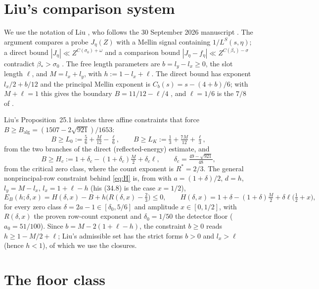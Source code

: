 \documentclass[11pt]{article}
\begin{document}
\section{Liu's comparison system}

We use the notation of Liu \cite{Liu26}, who follows the 30 September 2026 manuscript \cite{Ope26}. The argument compares a probe $J_\eta(Z)$ with a Mellin signal containing $1/L^S(s,\eta)$; a direct bound $|J_\eta|\ll Z^{C(\sigma_0)+\omega}$ and a comparison bound $|J_\eta-f_\eta|\ll Z^{C(\beta_*)-\sigma}$ contradict $\beta_*>\sigma_0$ \cite[Prop.~2.1]{Ope26}. The free length parameters are $b=l_y-l_x\ge0$, the slot length $\ell$, and $M=l_x+l_y$, with $h:=1-l_x+\ell$. The direct bound has exponent $l_x/2+b/12$ and the principal Mellin exponent is $C_b(s)=s-(4+b)/6$; with $M+\ell=1$ this gives the boundary $B=11/12-\ell/4$ \cite[(30.2)]{Liu26}, and $\ell=1/6$ is the $7/8$ of \cite{Ope26}.

Liu's Proposition~25.1 isolates three affine constraints that force $B\ge B_{\mathrm{alg}}=(1507-2\sqrt{921})/1653$:
\begin{equation}\label{eq:L}
B\ge L_0:=\tfrac56+\tfrac M{12}-\tfrac\ell6,\qquad B\ge L_K:=\tfrac13+\tfrac{7M}{12}+\tfrac\ell3,
\end{equation}
from the two branches of the direct (reflected-energy) estimate, and
\begin{equation}\label{eq:H}
B\ge H_c:=1+\delta_c-(1+\delta_c)\tfrac M2+\delta_c\ell,\qquad \delta_c=\tfrac{49-\sqrt{921}}{48},
\end{equation}
from the critical zero class, where the count exponent is $R^*=2/3$. The general nonprincipal-row constraint behind \eqref{eq:H} is, from \cite[(18.4)]{Liu26} with $a=(1+\delta)/2$, $d=h$, $l_y=M-l_x$, $l_x=1+\ell-h$ (his (34.8) is the case $x=1/2$),
\begin{equation}\label{eq:E}
E_B(h;\delta,x)=H(\delta,x)-B+h\bigl(R(\delta,x)-\tfrac23\bigr)\le0,\qquad H(\delta,x)=1+\delta-(1+\delta)\tfrac M2+\delta\ell\bigl(\tfrac12+x\bigr),
\end{equation}
for every zero class $\delta=2a-1\in[\delta_0,5/6]$ and amplitude $x\in[0,1/2]$, with $R(\delta,x)$ the proven row-count exponent and $\delta_0=1/50$ the detector floor ($a_0=51/100$). Since $b=M-2(1+\ell-h)$, the constraint $b\ge0$ reads $h\ge1-M/2+\ell$; Liu's admissible set has the strict forms $b>0$ and $l_x>\ell$ (hence $h<1$), of which we use the closures.

\section{The floor class}
\end{document}
